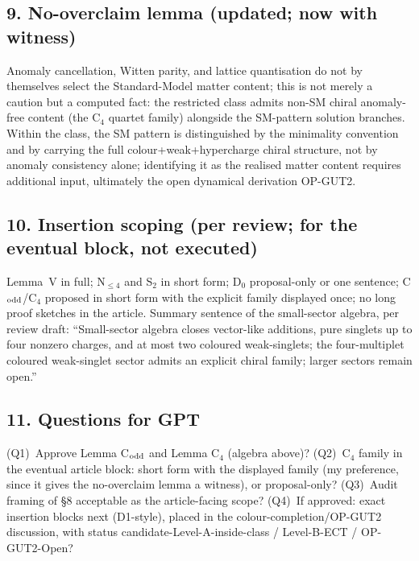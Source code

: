 \subsection*{9. No-overclaim lemma (updated; now with witness)}
Anomaly cancellation, Witten parity, and lattice quantisation do
not by themselves select the Standard-Model matter content; this
is not merely a caution but a computed fact: the restricted class
admits non-SM chiral anomaly-free content (the C$_4$ quartet
family) alongside the SM-pattern solution branches.
Within the class, the SM pattern is distinguished by the
minimality convention and by carrying the full
colour{+}weak{+}hypercharge chiral structure, not by anomaly
consistency alone; identifying it as the realised matter content
requires additional input, ultimately the open dynamical
derivation OP-GUT2.

\subsection*{10. Insertion scoping (per review; for the eventual
block, not executed)}
Lemma~V in full; N$_{\le4}$ and S$_2$ in short form; D$_0$
proposal-only or one sentence; C$_{\rm odd}$/C$_4$ proposed in
short form with the explicit family displayed once; no long proof
sketches in the article.
Summary sentence of the small-sector algebra, per review draft:
``Small-sector algebra closes vector-like additions, pure singlets
up to four nonzero charges, and at most two coloured
weak-singlets; the four-multiplet coloured weak-singlet sector
admits an explicit chiral family; larger sectors remain open.''

\subsection*{11. Questions for GPT}
(Q1)~Approve Lemma C$_{\rm odd}$ and Lemma C$_4$ (algebra above)?
(Q2)~C$_4$ family in the eventual article block: short form with
the displayed family (my preference, since it gives the
no-overclaim lemma a witness), or proposal-only?
(Q3)~Audit framing of \S8 acceptable as the article-facing scope?
(Q4)~If approved: exact insertion blocks next (D1-style), placed
in the colour-completion/OP-GUT2 discussion, with status
candidate-Level-A-inside-class / Level-B-ECT / OP-GUT2-Open?
